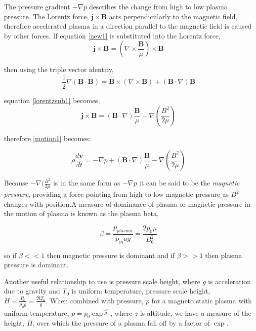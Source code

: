 \documentclass[11pt]{article}
\renewcommand{\vec}[1]{\mathbf{#1}}
\begin{document}
The pressure gradient $-\nabla p$ describes the change from high to low plasma pressure. The Lorentz force, $\vec{j}\times\vec{B}$ acts perpendicularly to the magnetic field, therefore accelerated plasma in a direction parallel to the magnetic field is caused by other forces. If equation \ref{new1} is substituted into the Lorentz force,
\begin{equation}\label{lorentzsub1}
\vec{j}\times\vec{B} = (\nabla\times\frac{\vec{B}}{\mu})\times\vec{B}
\end{equation}

then using the triple vector identity, 
\begin{equation}
\frac{1}2{}\nabla(\vec{B}\cdot\vec{B})=\vec{B}\times(\nabla\times\vec{B})+(\vec{B}\cdot\nabla)\vec{B}
\end{equation}

equation \ref{lorentzsub1} becomes,
\begin{equation}
\vec{j}\times\vec{B} = (\vec{B}\cdot\nabla)\frac{\vec{B}}{\mu}-\nabla(\frac{B^2}{2\mu}) 
\end{equation}

therefore \ref{motion1} becomes:

\begin{equation}\label{maghydstat}
\rho\frac{d\vec{v}}{dt}= -\nabla p + (\vec{B}\cdot\nabla)\frac{\vec{B}}{\mu}-\nabla(\frac{B^2}{2\mu}) 
\end{equation}

Because $-\nabla(\frac{B^2}{2\mu}$ is in the same form as $-\nabla p$ it can be said to be the \emph{magnetic pressure}, providing a force pointing from high to low magnetic pressure as $B^2$ changes with position.A measure of dominance of plasma or magnetic pressure in the motion of plasma is known as the plasma beta, 

\begin{equation}\label{beta}
\beta=\frac{p_{plasma}}{p_mag} = \frac{2p_{0}\mu}{B_{0}^2}
\end{equation}

so if $\beta << 1$ then magnetic pressure is dominant and if $\beta >> 1$ then plasma pressure is dominant.

Another useful relationship to use is pressure scale height, where $g$ is acceleration due to gravity and $T_0$ is uniform temperature, pressure scale height, $H=\frac{P_0}{\rho_{0}g} = \frac{\Re T_{0}}{g}$. When combined with pressure, $p$ for a magneto static plasma with uniform temperature, $p=p_{0}\exp^{\frac{-z}{H}}$, where $z$ is altitude, we have a measure of the height, $H$, over which the pressure of a plasma fall off by a factor of $\exp$. 
\end{document}
